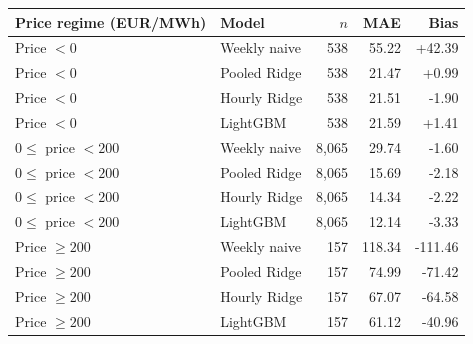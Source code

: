 \begin{tabular}{llrrr}
\toprule
Price regime (EUR/MWh) & Model & $n$ & MAE & Bias \\
\midrule
Price $<0$ & Weekly naive & 538 & 55.22 & +42.39 \\
Price $<0$ & Pooled Ridge & 538 & 21.47 & +0.99 \\
Price $<0$ & Hourly Ridge & 538 & 21.51 & -1.90 \\
Price $<0$ & LightGBM & 538 & 21.59 & +1.41 \\
$0\leq$ price $<200$ & Weekly naive & 8,065 & 29.74 & -1.60 \\
$0\leq$ price $<200$ & Pooled Ridge & 8,065 & 15.69 & -2.18 \\
$0\leq$ price $<200$ & Hourly Ridge & 8,065 & 14.34 & -2.22 \\
$0\leq$ price $<200$ & LightGBM & 8,065 & 12.14 & -3.33 \\
Price $\geq 200$ & Weekly naive & 157 & 118.34 & -111.46 \\
Price $\geq 200$ & Pooled Ridge & 157 & 74.99 & -71.42 \\
Price $\geq 200$ & Hourly Ridge & 157 & 67.07 & -64.58 \\
Price $\geq 200$ & LightGBM & 157 & 61.12 & -40.96 \\
\bottomrule
\end{tabular}
